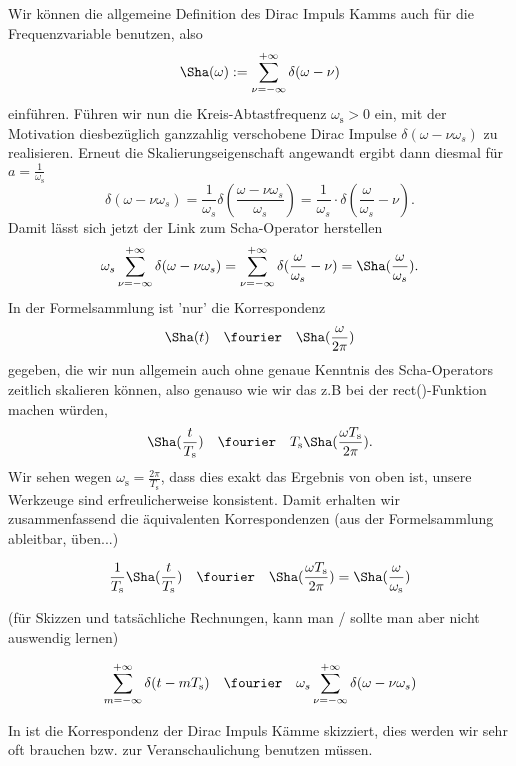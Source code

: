 Wir können die allgemeine Definition des Dirac Impuls Kamms
auch für die Frequenzvariable benutzen, also
\begin{equation}
{\Sha}(\omega) := \sum_{\nu=-\infty}^{+\infty} \delta(\omega-\nu)
\end{equation}
einführen.
Führen wir nun die Kreis-Abtastfrequenz $\omega_\mathrm{s}>0$ ein, mit der Motivation
diesbezüglich ganzzahlig verschobene Dirac Impulse $\delta(\omega - \nu \omega_s)$
zu realisieren.
Erneut die Skalierungseigenschaft angewandt ergibt dann diesmal für
$a=\frac{1}{\omega_\mathrm{s}}$
\begin{equation}
\delta(\omega - \nu \omega_s) =
\frac{1}{\omega_s}\delta(\frac{\omega - \nu \omega_s}{\omega_s}) =
\frac{1}{\omega_s} \cdot \delta(\frac{\omega}{\omega_s}-\nu).
\end{equation}
%
Damit lässt sich jetzt der Link zum Scha-Operator herstellen
\begin{equation}
\omega_s \sum_{\nu=-\infty}^{+\infty} \delta(\omega-\nu \omega_s) =
\sum_{\nu=-\infty}^{+\infty} \delta(\frac{\omega}{\omega_s}-\nu) =
{\Sha}(\frac{\omega}{\omega_s}).
\end{equation}
%
In der Formelsammlung ist 'nur' die Korrespondenz
\begin{align}
  \Sha(t) \quad\fourier\quad \Sha(\frac{\omega}{2\pi})
\end{align}
gegeben, die wir nun allgemein auch ohne genaue Kenntnis des Scha-Operators zeitlich
skalieren können, also genauso wie wir das z.B bei der rect()-Funktion machen würden,
\begin{align}
  \Sha(\frac{t}{T_\mathrm{s}}) \quad\fourier\quad
  T_\mathrm{s} \Sha(\frac{\omega T_\mathrm{s}}{2\pi}).
\end{align}
Wir sehen wegen $\omega_\mathrm{s} = \frac{2 \pi}{T_\mathrm{s}} $,
dass dies exakt das Ergebnis von oben ist, unsere Werkzeuge
sind erfreulicherweise konsistent.
%
Damit erhalten wir zusammenfassend die äquivalenten Korrespondenzen
(aus der Formelsammlung ableitbar, üben...)
\begin{mdframed}
\begin{equation}
\frac{1}{T_\mathrm{s}} {\Sha}(\frac{t}{T_\mathrm{s}}) \quad\fourier\quad
{\Sha}(\frac{\omega T_\mathrm{s}}{2 \pi}) =
\Sha(\frac{\omega}{\omega_\mathrm{s}})
\end{equation}
\end{mdframed}
(für Skizzen und tatsächliche Rechnungen, kann man / sollte man aber nicht
auswendig lernen)
\begin{mdframed}
\begin{equation}
\sum_{m=-\infty}^{+\infty} \delta(t-m T_\mathrm{s}) \quad\fourier\quad
\omega_s \sum_{\nu=-\infty}^{+\infty} \delta(\omega-\nu \omega_s)
\end{equation}
\end{mdframed}
%
In  ist die Korrespondenz der Dirac Impuls Kämme
skizziert, dies werden wir sehr oft brauchen bzw. zur Veranschaulichung benutzen
müssen.

